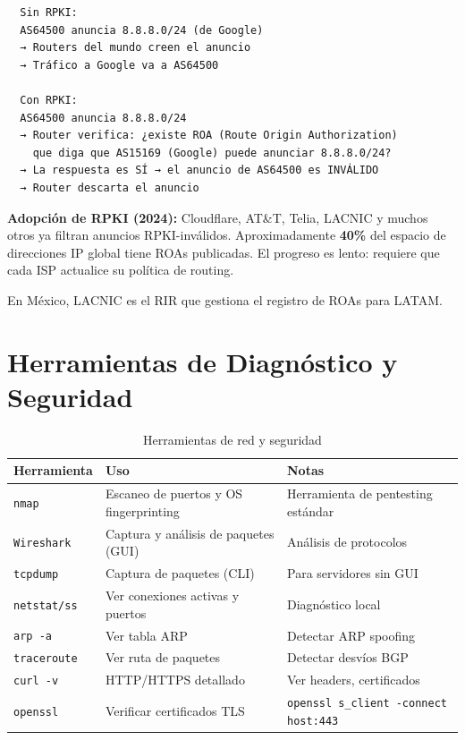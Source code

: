\begin{lstlisting}
  Sin RPKI:
  AS64500 anuncia 8.8.8.0/24 (de Google)
  → Routers del mundo creen el anuncio
  → Tráfico a Google va a AS64500

  Con RPKI:
  AS64500 anuncia 8.8.8.0/24
  → Router verifica: ¿existe ROA (Route Origin Authorization)
    que diga que AS15169 (Google) puede anunciar 8.8.8.0/24?
  → La respuesta es SÍ → el anuncio de AS64500 es INVÁLIDO
  → Router descarta el anuncio
\end{lstlisting}

\begin{moderno}
\textbf{ Adopción de RPKI (2024):} Cloudflare, AT\&T, Telia, LACNIC
y muchos otros ya filtran anuncios RPKI-inválidos. Aproximadamente \textbf{40\%}
del espacio de direcciones IP global tiene ROAs publicadas. El progreso es lento:
requiere que cada ISP actualice su política de routing.

En México, LACNIC es el RIR que gestiona el registro de ROAs para LATAM.
\end{moderno}

\section{ Herramientas de Diagnóstico y Seguridad}

\begin{table}[h!]
\centering
\renewcommand{\arraystretch}{1.3}
\begin{tabular}{lll}
\toprule
\textbf{Herramienta} & \textbf{Uso} & \textbf{Notas} \\
\midrule
\texttt{nmap}      & Escaneo de puertos y OS fingerprinting & Herramienta de pentesting estándar \\
\texttt{Wireshark} & Captura y análisis de paquetes (GUI) & Análisis de protocolos \\
\texttt{tcpdump}   & Captura de paquetes (CLI) & Para servidores sin GUI \\
\texttt{netstat/ss}& Ver conexiones activas y puertos & Diagnóstico local \\
\texttt{arp -a}    & Ver tabla ARP & Detectar ARP spoofing \\
\texttt{traceroute}& Ver ruta de paquetes & Detectar desvíos BGP \\
\texttt{curl -v}   & HTTP/HTTPS detallado & Ver headers, certificados \\
\texttt{openssl}   & Verificar certificados TLS & \texttt{openssl s\_client -connect host:443} \\
\bottomrule
\end{tabular}
\caption{Herramientas de red y seguridad}
\end{table}

